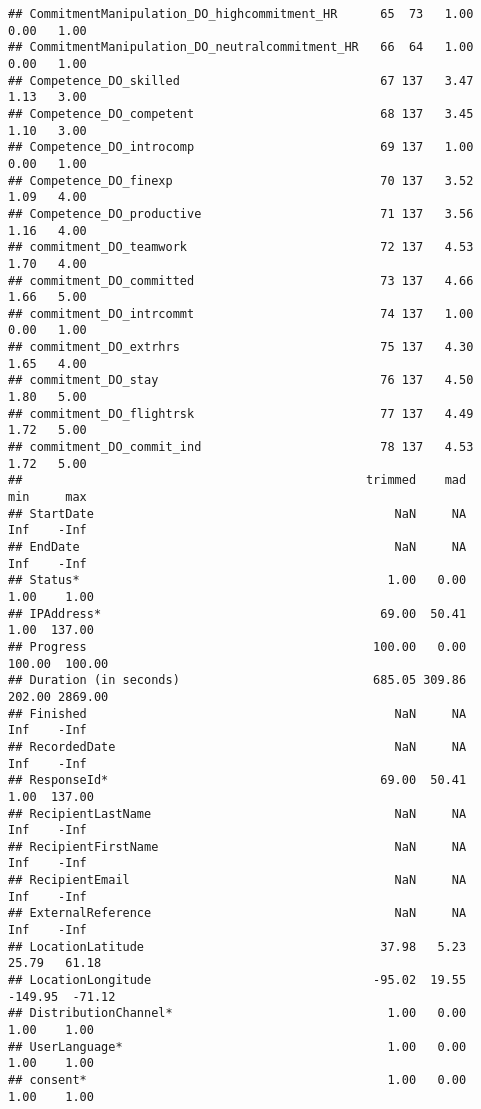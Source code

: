 \documentclass[]{article}
\begin{document}
\begin{verbatim}
## CommitmentManipulation_DO_highcommitment_HR      65  73   1.00   0.00   1.00
## CommitmentManipulation_DO_neutralcommitment_HR   66  64   1.00   0.00   1.00
## Competence_DO_skilled                            67 137   3.47   1.13   3.00
## Competence_DO_competent                          68 137   3.45   1.10   3.00
## Competence_DO_introcomp                          69 137   1.00   0.00   1.00
## Competence_DO_finexp                             70 137   3.52   1.09   4.00
## Competence_DO_productive                         71 137   3.56   1.16   4.00
## commitment_DO_teamwork                           72 137   4.53   1.70   4.00
## commitment_DO_committed                          73 137   4.66   1.66   5.00
## commitment_DO_intrcommt                          74 137   1.00   0.00   1.00
## commitment_DO_extrhrs                            75 137   4.30   1.65   4.00
## commitment_DO_stay                               76 137   4.50   1.80   5.00
## commitment_DO_flightrsk                          77 137   4.49   1.72   5.00
## commitment_DO_commit_ind                         78 137   4.53   1.72   5.00
##                                                trimmed    mad     min     max
## StartDate                                          NaN     NA     Inf    -Inf
## EndDate                                            NaN     NA     Inf    -Inf
## Status*                                           1.00   0.00    1.00    1.00
## IPAddress*                                       69.00  50.41    1.00  137.00
## Progress                                        100.00   0.00  100.00  100.00
## Duration (in seconds)                           685.05 309.86  202.00 2869.00
## Finished                                           NaN     NA     Inf    -Inf
## RecordedDate                                       NaN     NA     Inf    -Inf
## ResponseId*                                      69.00  50.41    1.00  137.00
## RecipientLastName                                  NaN     NA     Inf    -Inf
## RecipientFirstName                                 NaN     NA     Inf    -Inf
## RecipientEmail                                     NaN     NA     Inf    -Inf
## ExternalReference                                  NaN     NA     Inf    -Inf
## LocationLatitude                                 37.98   5.23   25.79   61.18
## LocationLongitude                               -95.02  19.55 -149.95  -71.12
## DistributionChannel*                              1.00   0.00    1.00    1.00
## UserLanguage*                                     1.00   0.00    1.00    1.00
## consent*                                          1.00   0.00    1.00    1.00

\end{verbatim}
\end{document}
